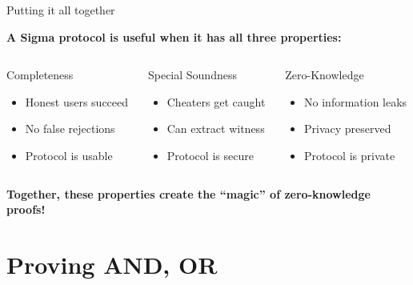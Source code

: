\documentclass[aspectratio=169, lualatex, handout]{beamer}
\begin{document}
\begin{frame}{Putting it all together}
	\begin{center}
		\textbf{A Sigma protocol is useful when it has all three properties:}
	\end{center}
	\vspace{0.5em}
	\begin{columns}[c]
		\begin{column}{0.33\textwidth}
			\begin{block}{Completeness}
				\begin{itemize}
					\item Honest users succeed
					\item No false rejections
					\item Protocol is usable
				\end{itemize}
			\end{block}
		\end{column}
		\begin{column}{0.33\textwidth}
			\begin{block}{Special Soundness}
				\begin{itemize}
					\item Cheaters get caught
					\item Can extract witness
					\item Protocol is secure
				\end{itemize}
			\end{block}
		\end{column}
		\begin{column}{0.33\textwidth}
			\begin{block}{Zero-Knowledge}
				\begin{itemize}
					\item No information leaks
					\item Privacy preserved
					\item Protocol is private
				\end{itemize}
			\end{block}
		\end{column}
	\end{columns}
	\vspace{1em}
	\begin{center}
		\textbf{Together, these properties create the ``magic'' of zero-knowledge proofs!}
	\end{center}
\end{frame}

\section{Proving AND, OR}
\end{document}
